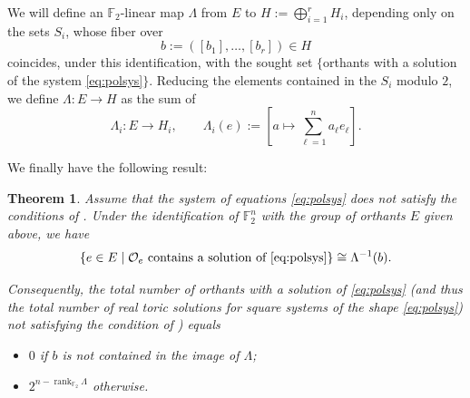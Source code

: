 \documentclass[a4paper]{article}
\newtheorem{theorem}{Theorem}
\theoremstyle{remark}
\newcommand{\setdes}[2]{\left\{#1\;\middle|\;#2\right\}}
\def\FF{\mathbb{F}}
\begin{document}
We will define an $\FF_2$-linear map $\Lambda$ from $E$ to
$H:=\bigoplus_{i=1}^r H_i$, depending only on the sets $S_i$, whose
fiber over $$b:=([b_1],\ldots,[b_r])\in H$$ coincides, under this
identification, with the sought set $\{$orthants with a solution of
the system \eqref{eq:polsys}$\}$. Reducing the elements contained in
the $S_i$ modulo $2$, we define $\Lambda:E\longrightarrow H$ as the sum of
$$
\Lambda_i:E\longrightarrow H_i,
\qquad
\Lambda_i(e)
:=\left[
a\longmapsto\sum_{\ell=1}^n a_\ell e_\ell
\right].
$$

We finally have the following result:

\begin{theorem}\label{thm:rootcounting}
  Assume that the system of equations \eqref{eq:polsys} does not
  satisfy the conditions of . Under the identification of
  $\FF_2^n$ with the group of orthants $E$ given above, we have
  \[\setdes{e\in E}{\mathcal{O}_e\text{ contains a solution of \eqref{eq:polsys}}} \cong \Lambda^{-1}(b).\]

  Consequently, the total number of orthants with a solution of
  \eqref{eq:polsys} (and thus the total number of real toric solutions
  for square systems of the shape \eqref{eq:polsys}) not satisfying the
  condition of ) equals
  \begin{itemize}
  \item $0$ if $b$ is not contained in the image of $\Lambda$;
  \item $2^{n-\operatorname{rank}_{\mathbb F_2}\Lambda}$ otherwise.
  \end{itemize}
\end{theorem}
\end{document}

